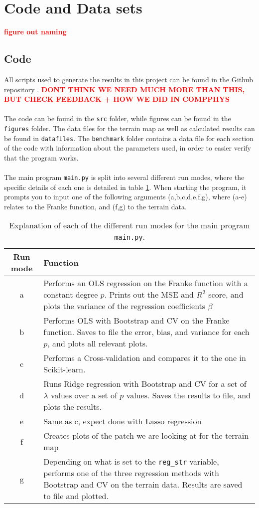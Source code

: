 \documentclass[a4paper]{article}
\newcommand\red[1]{\textcolor{red}{\textbf{#1}}}
\begin{document}
\section{Code and Data sets} \label{chap:implement}
\red{figure out naming}
\subsection{Code}
All scripts used to generate the results in this project can be found in the Github repository \cite{Github1}. \red{DONT THINK WE NEED MUCH MORE THAN THIS, BUT CHECK FEEDBACK + HOW WE DID IN COMPPHYS}
\\\\
The code can be found in the \texttt{src} folder, while figures can be found in the \texttt{figures} folder. The data files for the terrain map as well as calculated results can be found in \texttt{datafiles}. The \texttt{benchmark} folder contains a data file for each section of the code with information about the parameters used, in order to easier verify that the program works.
\\\\
The main program \texttt{main.py} is split into several different run modes, where the specific details of each one is detailed in table \ref{tab:run_modes}. When starting the program, it prompts you to input one of the following arguments (a,b,c,d,e,f,g), where (a-e) relates to the Franke function, and (f,g) to the terrain data.
\begin{table}[H]
  \centering
  \caption{Explanation of each of the different run modes for the main program \texttt{main.py}.}
  \label{tab:run_modes}
  \begin{tabular}{c|p{12cm}}
    \textbf{Run mode} & \textbf{Function}\\\hline
    a & Performs an OLS regression on the Franke function with a constant degree $p$. Prints out the MSE and $R^2$ score, and plots the variance of the regression coefficients $\beta$\\\hline
    b & Performs OLS with Bootstrap and CV on the Franke function. Saves to file the error, bias, and variance for each $p$, and plots all relevant plots.\\\hline
    c & Performs a Cross-validation and compares it to the one in Scikit-learn.\\\hline
    d & Runs Ridge regression with Bootstrap and CV for a set of $\lambda$ values over a set of $p$ values. Saves the results to file, and plots the results.\\\hline
    e & Same as c, expect done with Lasso regression\\\hline
    f & Creates plots of the patch we are looking at for the terrain map\\\hline
    g & Depending on what is set to the \texttt{reg\_str} variable, performs one of the three regression methods with Bootstrap and CV on the terrain data. Results are saved to file and plotted.
    \end{tabular}
\end{table}
\end{document}
